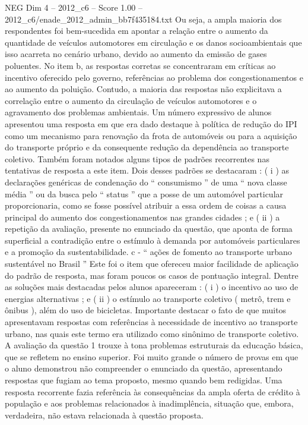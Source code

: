 \begin{textsample}{NEG Dim 4 – 2012\_c6 – Score 1.00 – 2012\_c6/enade\_2012\_admin\_bb7f435184.txt}
Ou seja, a ampla maioria dos respondentes foi bem-sucedida em apontar a relação entre o aumento da quantidade de veículos automotores em circulação e os danos socioambientais que isso acarreta no cenário urbano, devido ao aumento da emissão de gases poluentes.
No item b, as respostas corretas se concentraram em críticas ao incentivo oferecido pelo governo, referências ao problema dos congestionamentos e ao aumento da poluição.
Contudo, a maioria das respostas não explicitava a correlação entre o aumento da circulação de veículos automotores e o agravamento dos problemas ambientais.
Um número expressivo de alunos apresentou uma resposta em que era dado destaque à política de redução do IPI como um mecanismo para renovação da frota de automóveis ou para a aquisição do transporte próprio e da consequente redução da dependência ao transporte coletivo.
Também foram notados alguns tipos de padrões recorrentes nas tentativas de resposta a este item.
Dois desses padrões se destacaram : ( i ) as declarações genéricas de condenação do “ consumismo ” de uma “ nova classe média ” ou da busca pelo “ status ” que a posse de um automóvel particular proporcionaria, como se fosse possível atribuir a essa ordem de coisas a causa principal do aumento dos congestionamentos nas grandes cidades ; e ( ii ) a repetição da avaliação, presente no enunciado da questão, que aponta de forma superficial a contradição entre o estímulo à demanda por automóveis particulares e a promoção da sustentabilidade. c - “ ações de fomento ao transporte urbano sustentável no Brasil ” Este foi o item que ofereceu maior facilidade de aplicação do padrão de resposta, mas foram poucos os casos de pontuação integral.
Dentre as soluções mais destacadas pelos alunos apareceram : ( i ) o incentivo ao uso de energias alternativas ; e ( ii ) o estímulo ao transporte coletivo ( metrô, trem e ônibus ), além do uso de bicicletas.
Importante destacar o fato de que muitos apresentavam respostas com referências à necessidade de incentivo ao transporte urbano, nas quais este termo era utilizado como sinônimo de transporte coletivo.
A avaliação da questão 1 trouxe à tona problemas estruturais da educação básica, que se refletem no ensino superior.
Foi muito grande o número de provas em que o aluno demonstrou não compreender o enunciado da questão, apresentando respostas que fugiam ao tema proposto, mesmo quando bem redigidas.
Uma resposta recorrente fazia referência às consequências da ampla oferta de crédito à população e aos problemas relacionados à inadimplência, situação que, embora, verdadeira, não estava relacionada à questão proposta.

\end{textsample}
